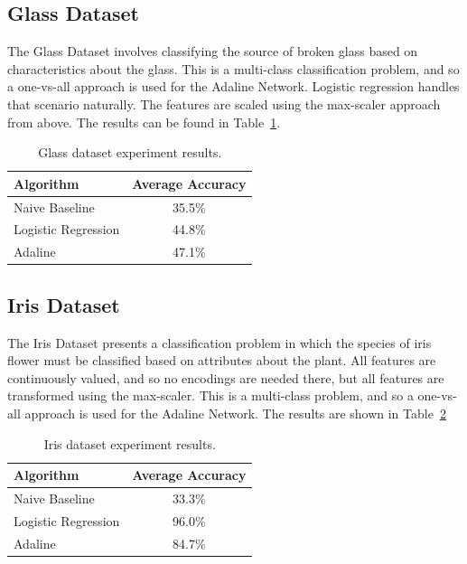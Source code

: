 \documentclass{amsart}
\begin{document}
    \subsection{Glass Dataset}
    The Glass Dataset\cite{glassdataset} involves classifying the source of
    broken glass based on characteristics about the glass. This is a multi-class
    classification problem, and so a one-vs-all approach is used for the
    Adaline Network. Logistic regression handles that scenario naturally.
    The features are scaled using the max-scaler approach from above.
    The results can be found in Table~\ref{glass_results}.
    \begin{table}[H]
    \begin{tabular}{lc}
    Algorithm & Average Accuracy \\
    \hline
    Naive Baseline & 35.5\% \\
    Logistic Regression & 44.8\% \\
    Adaline & 47.1\%
    \end{tabular}
    \label{glass_results}
        \caption{Glass dataset experiment results.}
    \end{table}

    \subsection{Iris Dataset}
    The Iris Dataset\cite{irisdataset} presents a classification
    problem in which the species of iris flower must be classified based
    on attributes about the plant. All features are continuously
    valued, and so no encodings are needed there, but all features are transformed
    using the max-scaler. This is a multi-class problem, and so
    a one-vs-all approach is used for the Adaline Network. The results are
    shown in Table~\ref{iris_results}
    \begin{table}[H]
    \begin{tabular}{lc}
    Algorithm & Average Accuracy \\
    \hline
    Naive Baseline & 33.3\% \\
    Logistic Regression & 96.0\% \\
    Adaline & 84.7\%
    \end{tabular}
    \label{iris_results}
        \caption{Iris dataset experiment results.}
    \end{table}
\end{document}
